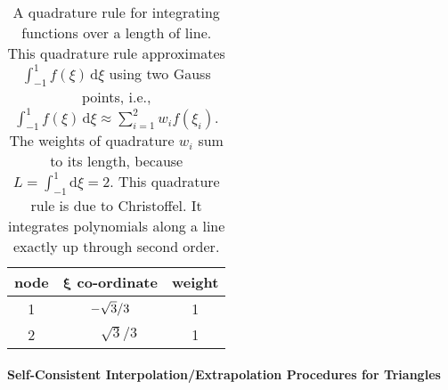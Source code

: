 \begin{table}[htp]
    \begin{center}
    \caption{A quadrature rule for integrating functions over a length of line.  This quadrature rule approximates $\int_{-1}^1 f(\xi) \, \mathrm{d}\xi$ using two Gauss points, i.e., $\int_{-1}^1 f(\xi) \, \mathrm{d}\xi \approx \sum_{i=1}^2 w_i f(\xi_i)$.  The weights of quadrature $w_i$ sum to its length, because $L = \int_{-1}^1 \mathrm{d} \xi = 2$.  This quadrature rule is due to Christoffel.  It integrates polynomials along a line exactly up through second order.}
    \label{tab:2nodeRod}
    \footnotesize
        \begin{tabular}{ccc}
            \hline
            \textbf{node} & $\boldsymbol{\xi}$ \textbf{co-ordinate} & 
            \textbf{weight} \\ \hline        
            1 & $-\sqrt{3} / 3^{\vphantom{|^|}}$ & 1 \\ 
            2 & $\phantom{-}\sqrt{3} / 3$ & 1 \\ 
            \hline
        \end{tabular}
    \end{center}
\end{table}

\paragraph{Self-Consistent Interpolation\slash Extrapolation Procedures for Triangles}

